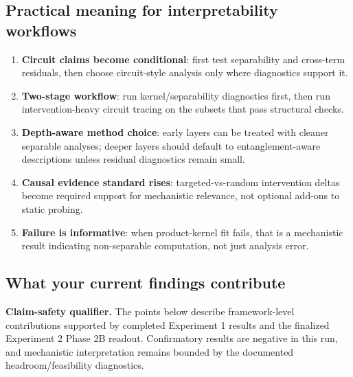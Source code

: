 \documentclass[11pt]{article}
\begin{document}
\subsection*{Practical meaning for interpretability workflows}
\begin{enumerate}[leftmargin=*]
  \item \textbf{Circuit claims become conditional}: first test separability and cross-term residuals, then choose circuit-style analysis only where diagnostics support it.
  \item \textbf{Two-stage workflow}: run kernel/separability diagnostics first, then run intervention-heavy circuit tracing on the subsets that pass structural checks.
  \item \textbf{Depth-aware method choice}: early layers can be treated with cleaner separable analyses; deeper layers should default to entanglement-aware descriptions unless residual diagnostics remain small.
  \item \textbf{Causal evidence standard rises}: targeted-vs-random intervention deltas become required support for mechanistic relevance, not optional add-ons to static probing.
  \item \textbf{Failure is informative}: when product-kernel fit fails, that is a mechanistic result indicating non-separable computation, not just analysis error.
\end{enumerate}

\subsection*{What your current findings contribute}
\textbf{Claim-safety qualifier.} The points below describe framework-level contributions supported by completed Experiment 1 results and the finalized Experiment 2 Phase 2B readout. Confirmatory results are negative in this run, and mechanistic interpretation remains bounded by the documented headroom/feasibility diagnostics.
\end{document}
